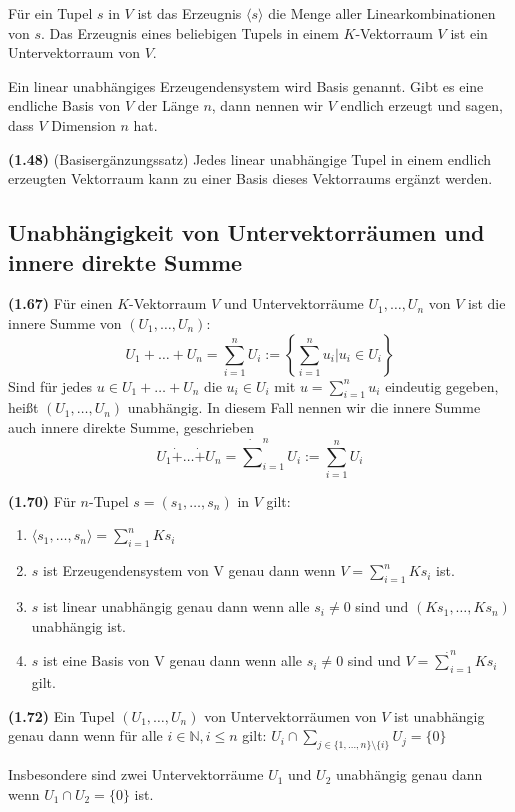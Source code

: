 \documentclass[a4paper,parskip=half*,DIV=15,fontsize=11pt]{scrartcl}
\newlength{\hangwidth}
\newcommand{\skript}[1]{\settowidth{\hangwidth}{\textbf{(#1)} }\hangpara{\hangwidth}{1}\textbf{(#1)} \ignorespaces} %
\begin{document}
Für ein Tupel $s$ in $V$ ist das Erzeugnis $\langle s \rangle$ die Menge aller Linearkombinationen von $s$. Das Erzeugnis eines beliebigen Tupels in einem $K$-Vektorraum $V$ ist ein Untervektorraum von $V$.

Ein linear unabhängiges Erzeugendensystem wird Basis genannt. Gibt es eine endliche Basis von $V$ der Länge $n$, dann nennen wir $V$ endlich erzeugt und sagen, dass $V$ Dimension $n$ hat.

\skript{1.48} (Basisergänzungssatz) Jedes linear unabhängige Tupel in einem endlich erzeugten Vektorraum kann zu einer Basis dieses Vektorraums ergänzt werden.

\subsection{Unabhängigkeit von Untervektorräumen und innere direkte Summe}

\skript{1.67} Für einen $K$-Vektorraum $V$ und Untervektorräume $U_1,\ldots,U_n$ von $V$ ist die innere Summe von $(U_1,\ldots,U_n)$:
$$ U_1 + \ldots + U_n =  \sum_{i = 1}^n U_i := \left\{ \sum_{i=1}^n u_i \vert u_i \in U_i \right\}$$
Sind für jedes $u \in U_1 + \ldots + U_n$ die $u_i \in U_i$ mit $u = \sum_{i=1}^n u_i$ eindeutig gegeben, heißt $(U_1,\ldots,U_n)$ unabhängig. In diesem Fall nennen wir die innere Summe auch innere direkte Summe, geschrieben
$$ U_1 \dot+ \ldots \dot+ U_n = \dot\sum_{i=1}^n U_i := \sum_{i=1}^n U_i$$

\skript{1.70} Für $n$-Tupel $s = (s_1,\ldots,s_n)$ in $V$ gilt:
\begin{enumerate}
	\item $\langle s_1,\ldots,s_n\rangle = \sum_{i=1}^{n} Ks_i$
	\item $s$ ist Erzeugendensystem von V genau dann wenn $V = \sum_{i=1}^n Ks_i$ ist.
	\item $s$ ist linear unabhängig genau dann wenn alle $s_i \neq 0$ sind und $(Ks_1,\ldots,Ks_n)$ unabhängig ist.
	\item $s$ ist eine Basis von V genau dann wenn alle $s_i \neq 0$ sind und $V = \dot\sum_{i=1}^n K s_i$  gilt.
\end{enumerate}

\skript{1.72} Ein Tupel $(U_1,\ldots,U_n)$ von Untervektorräumen von $V$ ist unabhängig genau dann wenn für alle $i \in \mathbb{N}, i \le n$ gilt: $U_i \cap \sum_{j \in \{1,\ldots,n\}\setminus\{i\}} U_j = \{0\}$

Insbesondere sind zwei Untervektorräume $U_1$ und $U_2$ unabhängig genau dann wenn $U_1 \cap U_2 = \{0\}$ ist.
\end{document}
